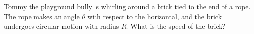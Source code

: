 Tommy the playground bully is whirling around a brick tied to the end
of a rope. The rope makes an angle $\theta$ with respect to the
horizontal, and the brick undergoes circular motion with radius $R$.
What is the speed of the brick?
